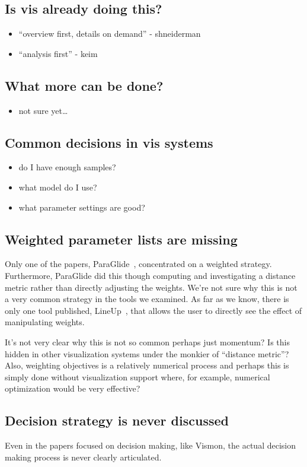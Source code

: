 \subsection{Is vis already doing this?}\label{is-vis-already-doing-this}

\begin{itemize}
\tightlist
\item
  ``overview first, details on demand'' - shneiderman
\item
  ``analysis first'' - keim
\end{itemize}

\subsection{What more can be done?}\label{what-more-can-be-done}

\begin{itemize}
\tightlist
\item
  not sure yet\ldots{}
\end{itemize}

\subsection{Common decisions in vis
systems}\label{common-decisions-in-vis-systems}

\begin{itemize}
\tightlist
\item
  do I have enough samples?
\item
  what model do I use?
\item
  what parameter settings are good?
\end{itemize}

\subsection{Weighted parameter lists are
missing}\label{weighted-parameter-lists-are-missing}

Only one of the papers, ParaGlide~\citep{Bergner:2013}, concentrated on a
weighted strategy. Furthermore, ParaGlide did this though computing and
investigating a distance metric rather than directly adjusting the
weights. We're not sure why this is not a very common strategy in the
tools we examined. As far as we know, there is only one tool published,
LineUp~\citep{Gratzl:2013}, that allows the user to directly see the
effect of manipulating weights.

It's not very clear why this is not so common perhaps just momentum? Is
this hidden in other visualization systems under the monkier of
``distance metric''? Also, weighting objectives is a relatively
numerical process and perhaps this is simply done without visualization
support where, for example, numerical optimization would be very
effective?

\subsection{Decision strategy is never
discussed}\label{decision-strategy-is-never-discussed}

Even in the papers focused on decision making, like Vismon, the actual
decision making process is never clearly articulated.
